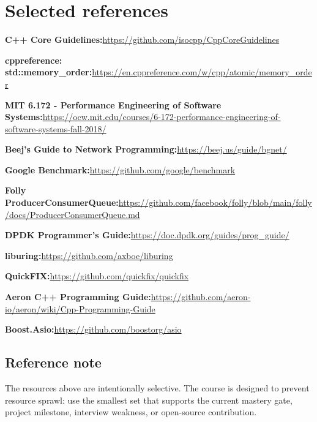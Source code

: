 \documentclass[11pt,letterpaper]{article}
\begin{document}
\section{Selected references}\label{sec:23}

\begin{flushleft}
\small

\textbf{C++ Core Guidelines:}\newline \url{https://github.com/isocpp/CppCoreGuidelines}

\textbf{cppreference: std::memory\_order:}\newline \url{https://en.cppreference.com/w/cpp/atomic/memory\_order}

\textbf{MIT 6.172 - Performance Engineering of Software Systems:}\newline \url{https://ocw.mit.edu/courses/6-172-performance-engineering-of-software-systems-fall-2018/}

\textbf{Beej's Guide to Network Programming:}\newline \url{https://beej.us/guide/bgnet/}

\textbf{Google Benchmark:}\newline \url{https://github.com/google/benchmark}

\textbf{Folly ProducerConsumerQueue:}\newline \url{https://github.com/facebook/folly/blob/main/folly/docs/ProducerConsumerQueue.md}

\textbf{DPDK Programmer's Guide:}\newline \url{https://doc.dpdk.org/guides/prog\_guide/}

\textbf{liburing:}\newline \url{https://github.com/axboe/liburing}

\textbf{QuickFIX:}\newline \url{https://github.com/quickfix/quickfix}

\textbf{Aeron C++ Programming Guide:}\newline \url{https://github.com/aeron-io/aeron/wiki/Cpp-Programming-Guide}

\textbf{Boost.Asio:}\newline \url{https://github.com/boostorg/asio}

\subsection*{Reference note}

The resources above are intentionally selective. The course is designed to prevent resource sprawl: use the smallest set that supports the current mastery gate, project milestone, interview weakness, or open-source contribution.

\end{flushleft}
\end{document}
